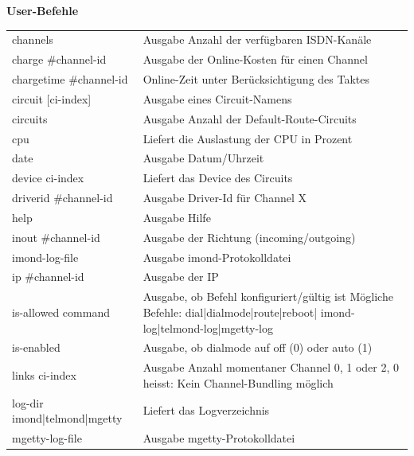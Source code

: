   \begin{table}
    \textbf{User-Befehle}

    \vspace{1ex}
    \begin{tabular}{lp{9cm}}
      channels                  & Ausgabe Anzahl der verfügbaren ISDN-Kanäle\\
      charge \#channel-id       & Ausgabe der Online-Kosten für einen
                                  Channel\\
      chargetime \#channel-id   & Online-Zeit unter Berücksichtigung des
                                  Taktes\\
      circuit [ci-index]        & Ausgabe eines Circuit-Namens\\
      circuits                  & Ausgabe Anzahl der Default-Route-Circuits\\
      cpu                       & Liefert die Auslastung der CPU in Prozent\\
      date                      & Ausgabe Datum/Uhrzeit\\
      device ci-index           & Liefert das Device des Circuits\\
      driverid \#channel-id     & Ausgabe Driver-Id für Channel X\\
      help                      & Ausgabe Hilfe\\
      inout \#channel-id        & Ausgabe der Richtung (incoming/outgoing)\\
      imond-log-file            & Ausgabe imond-Protokolldatei\\
      ip \#channel-id           & Ausgabe der IP\\
      is-allowed command        & Ausgabe, ob Befehl konfiguriert/gültig
                                  ist\newline
                                  Mögliche Befehle:
                                    dial|dialmode|route|reboot|
                                    imond-log|telmond-log|mgetty-log \\
      is-enabled                & Ausgabe, ob dialmode auf off (0) oder auto
                                  (1)\\
      links ci-index            & Ausgabe Anzahl momentaner Channel 0, 1 oder
                                  2, 0 heisst: Kein Channel-Bundling möglich\\
      log-dir imond|telmond|mgetty& Liefert das Logverzeichnis\\
      mgetty-log-file           & Ausgabe mgetty-Protokolldatei\\

\end{tabular}
\end{table}
